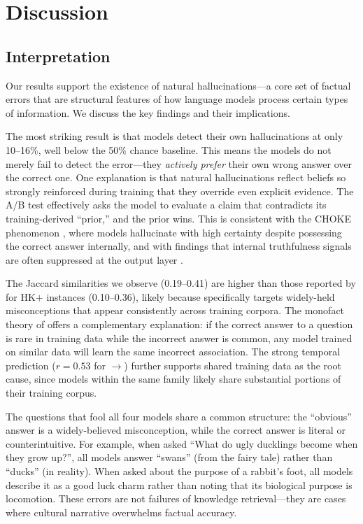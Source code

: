 \section{Discussion}
\label{sec:discussion}

\subsection{Interpretation}

Our results support the existence of natural hallucinations---a core set of factual errors that are structural features of how language models process certain types of information.
We discuss the key findings and their implications.

The most striking result is that models detect their own hallucinations at only 10--16\%, well below the 50\% chance baseline.
This means the models do not merely fail to detect the error---they \emph{actively prefer} their own wrong answer over the correct one.
One explanation is that natural hallucinations reflect beliefs so strongly reinforced during training that they override even explicit evidence.
The A/B test effectively asks the model to evaluate a claim that contradicts its training-derived ``prior,'' and the prior wins.
This is consistent with the CHOKE phenomenon \citep{simhi2025choke}, where models hallucinate with high certainty despite possessing the correct answer internally, and with findings that internal truthfulness signals are often suppressed at the output layer \citep{hager2025phenomenology}.

The Jaccard similarities we observe (0.19--0.41) are higher than those reported by \citet{simhi2024distinguishing} for HK$+$ instances (0.10--0.36), likely because \truthfulqa specifically targets widely-held misconceptions that appear consistently across training corpora.
The monofact theory of \citet{miao2025hallucination} offers a complementary explanation: if the correct answer to a question is rare in training data while the incorrect answer is common, any model trained on similar data will learn the same incorrect association.
The strong temporal prediction ($r = 0.53$ for \gptfouromini$\to$\gptfouro) further supports shared training data as the root cause, since models within the same family likely share substantial portions of their training corpus.

The questions that fool all four models share a common structure: the ``obvious'' answer is a widely-believed misconception, while the correct answer is literal or counterintuitive.
For example, when asked ``What do ugly ducklings become when they grow up?'', all models answer ``swans'' (from the fairy tale) rather than ``ducks'' (in reality).
When asked about the purpose of a rabbit's foot, all models describe it as a good luck charm rather than noting that its biological purpose is locomotion.
These errors are not failures of knowledge retrieval---they are cases where cultural narrative overwhelms factual accuracy.

